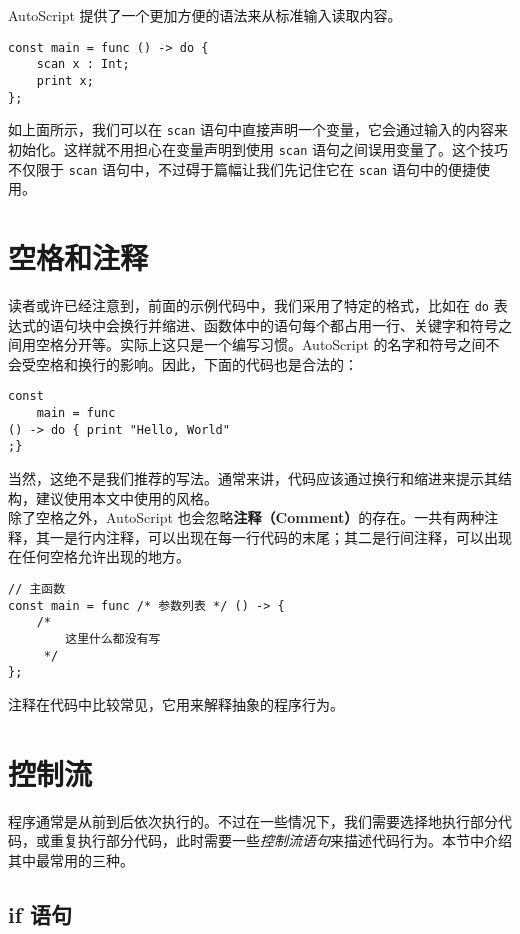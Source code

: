 AutoScript 提供了一个更加方便的语法来从标准输入读取内容。

\begin{lstlisting}
const main = func () -> do {
    scan x : Int;
    print x;
};
\end{lstlisting}

如上面所示，我们可以在 \lstinline!scan! 语句中直接声明一个变量，它会通过输入的内容来初始化。这样就不用担心在变量声明到使用 \lstinline!scan! 语句之间误用变量了。这个技巧不仅限于 \lstinline!scan! 语句中，不过碍于篇幅让我们先记住它在 \lstinline!scan! 语句中的便捷使用。


\section{空格和注释}

读者或许已经注意到，前面的示例代码中，我们采用了特定的格式，比如在 \lstinline!do! 表达式的语句块中会换行并缩进、函数体中的语句每个都占用一行、关键字和符号之间用空格分开等。实际上这只是一个编写习惯。AutoScript 的名字和符号之间不会受空格和换行的影响。因此，下面的代码也是合法的：

\begin{lstlisting}
const
    main = func
() -> do { print "Hello, World"
;}
\end{lstlisting}

当然，这绝不是我们推荐的写法。通常来讲，代码应该通过换行和缩进来提示其结构，建议使用本文中使用的风格。 \\

除了空格之外，AutoScript 也会忽略\textbf{注释（Comment）}的存在。一共有两种注释，其一是行内注释，可以出现在每一行代码的末尾；其二是行间注释，可以出现在任何空格允许出现的地方。

\begin{lstlisting}
// 主函数
const main = func /* 参数列表 */ () -> {
    /*
        这里什么都没有写
     */
};
\end{lstlisting}

注释在代码中比较常见，它用来解释抽象的程序行为。


\section{控制流}

程序通常是从前到后依次执行的。不过在一些情况下，我们需要选择地执行部分代码，或重复执行部分代码，此时需要一些\emph{控制流语句}来描述代码行为。本节中介绍其中最常用的三种。

\subsection{if 语句}

